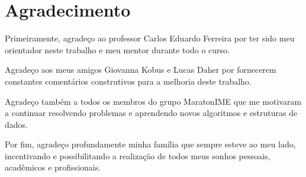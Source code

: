 \chapter*{Agradecimento}
\label{agradecimento}

Primeiramente, agradeço ao professor Carlos Eduardo Ferreira por ter sido meu orientador neste trabalho e meu mentor durante todo o curso. 

Agradeço aos meus amigos Giovanna Kobus e Lucas Daher por fornecerem constantes comentários construtivos para a melhoria deste trabalho.

Agradeço também a todos os membros do grupo MaratonIME que me motivaram a continuar resolvendo problemas e aprendendo novos algoritmos e estruturas de dados.

Por fim, agradeço profundamente minha família que sempre esteve ao meu lado, incentivando e possibilitando a realização de todos meus sonhos pessoais, acadêmicos e profissionais.